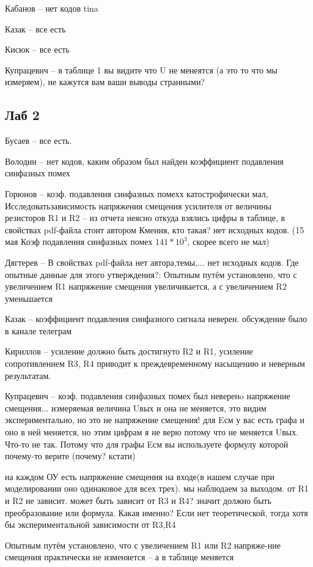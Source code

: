 \documentclass[a4paper,11pt]{article}
\begin{document}
Кабанов -- нет кодов tina

Казак -- все есть

Кисюк -- все есть

Купрацевич -- в таблице 1 вы видите что U не менеятся (а это то что мы измеряем), не кажутся вам ваши выводы странными? 

\newpage
\subsection*{Лаб 2}

Бусаев -- все есть.

Володин -- нет кодов, каким образом был найден коэффициент подавления синфазных помех

Горюнов -- коэф. подавления синфазных помехх катострофически мал, Исследоватьзависимость напряжения смещения усилителя от величины резисторов R1 и R2
-- из отчета неясно откуда взялись цифры в таблице, в свойствах pdf-файла стоит автором Кмения, кто такая? нет исходных кодов. 
(15 мая Коэф подавления синфазных помех $141*10^3$, скорее всего не мал)

Дягтерев --  В свойствах pdf-файла нет автора,темы,... нет исходных кодов. Где опытные данные для этого утверждения?: Опытным путём установлено, что с увеличением R1 напряжение смещения увеличивается, а с увеличением R2 уменьшается

Казак -- коэффициент подавления синфазного сигнала неверен.
обсуждение было в канале телеграм

Кириллов -- усиление должно быть достигнуто R2 и R1, усиление сопротивлением R3, R4 приводит к преждевременному насыщению и неверным результатам.


Купрацевич -- коэф. подавления синфазных помех был неверенo
напряжение смещения...
измеряемая величина Uвых и она не меняется, это видим экспериментально,
но это не напряжение смещения! для Eсм у вас есть графа и оно в ней меняется, но этим цифрам я не верю потому что не меняется Uвых.
Что-то не так.
Потому что для графы Eсм вы используете формулу которой почему-то верите (почему? кстати)

на каждом ОУ есть напряжение смещения на входе(в нашем случае при моделировании оно одинаковое для всех трех). мы наблюдаем за выходом. от R1 и R2 не зависит. может быть зависит от R3 и R4? значит должно быть преобразование или формула.
Какая именно? Если нет теоретической, тогда хотя бы экспериментальной зависимости от R3,R4

Опытным путём установлено, что с увеличением R1 или R2 напряже-ние смещения практически не изменяется -- а в таблице меняется
\end{document}
